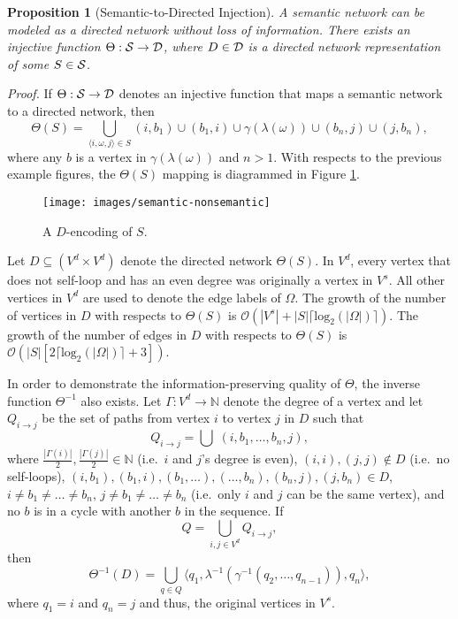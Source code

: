 \documentclass[twocolumn,preprintnumbers,amsmath,amssymb,letter]{revtex4}
\newcommand{\rar}{\rightarrow}
\newcommand{\ra}{\rangle}
\newcommand{\la}{\langle}
\newcommand{\mb}{\mathbb}
\newtheorem{proposition}{Proposition}
\begin{document}
\begin{proposition}[Semantic-to-Directed Injection]
A semantic network can be modeled as a directed network without loss of information. There exists an injective function $\Theta : \cal{S} \rar \cal{D}$, where $D \in \cal{D}$ is a directed network representation of some $S \in \cal{S}$.
\end{proposition}
\emph{Proof.} If $\Theta : \cal{S} \rar \cal{D}$ denotes an injective function that maps a semantic network to a directed network, then
\begin{equation*}
	\Theta(S) = \bigcup_{\la i,\omega,j \ra \in S} (i,b_1) \cup (b_1,i) \cup \gamma(\lambda(\omega)) \cup (b_n,j) \cup (j,b_n),
\end{equation*}
where any $b$ is a vertex in $\gamma(\lambda(\omega))$ and $n > 1$. With respects to the previous example figures, the $\Theta(S)$ mapping is diagrammed in Figure \ref{fig:semantic-nonsemantic}.
\begin{figure}[h!]
	\centering
	\texttt{[image: images/semantic-nonsemantic]}
	 \caption{\label{fig:semantic-nonsemantic}A $D$-encoding of $S$.}
\end{figure}

Let $D \subseteq (V^d \times V^d)$ denote the directed network $\Theta(S)$. In $V^d$, every vertex that does not self-loop and has an even degree was originally a vertex in $V^s$. All other vertices in $V^d$ are used to denote the edge labels of $\Omega$. The growth of the number of vertices in $D$ with respects to $\Theta(S)$ is $\mathcal{O}(|V^s| + |S|\lceil\text{log}_2(|\Omega|)\rceil)$. The growth of the number of edges in $D$ with respects to $\Theta(S)$ is $\mathcal{O}(|S|[2\lceil\text{log}_2(|\Omega|)\rceil+3])$.

In order to demonstrate the information-preserving quality of $\Theta$, the inverse function $\Theta^{-1}$ also exists. Let $\Gamma: V^d \rar \mb{N}$ denote the degree of a vertex and let $Q_{i \rar j}$ be the set of paths from vertex $i$ to vertex $j$ in $D$ such that
\begin{equation*}
	Q_{i \rar j} = \bigcup \; (i,b_1,\ldots,b_n,j),
\end{equation*}
where $\frac{|\Gamma(i)|}{2},\frac{|\Gamma(j)|}{2} \in \mb{N}$ (i.e.~$i$ and $j$'s degree is even), $(i,i),(j,j) \notin D$ (i.e.~no self-loops), $(i,b_1),(b_1,i),(b_1,\ldots),(\ldots,b_n),(b_n,j),(j,b_n) \in D$, $i \neq b_1 \neq \ldots \neq b_n$, $j \neq b_1 \neq \ldots \neq b_n$ (i.e.~only $i$ and $j$ can be the same vertex), and no $b$ is in a cycle with another $b$ in the sequence. If
\begin{equation*}
	Q = \bigcup_{i,j \in V^d} Q_{i \rar j},
\end{equation*}
then
\begin{equation*}
	\Theta^{-1}(D) = \bigcup_{q \in Q} \la q_1, \lambda^{-1}(\gamma^{-1}(q_2, \ldots, q_{n-1})), q_n \ra,
\end{equation*}
where $q_1= i$ and $q_n = j$ and thus, the original vertices in $V^s$.
\end{document}
